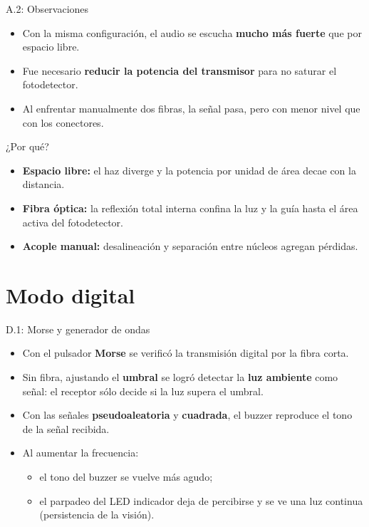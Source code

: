 \documentclass[aspectratio=1610]{beamer}
\begin{document}
\begin{frame}{A.2: Observaciones}
  \begin{itemize}
    \item Con la misma configuración, el audio se escucha \textbf{mucho más fuerte} que por espacio libre.
    \item Fue necesario \textbf{reducir la potencia del transmisor} para no saturar el fotodetector.
    \item Al enfrentar manualmente dos fibras, la señal pasa, pero con menor nivel que con los conectores.
  \end{itemize}

  \vspace{0.3cm}
  \begin{block}{¿Por qué?}
    \begin{itemize}
      \item \textbf{Espacio libre:} el haz diverge y la potencia por unidad de área decae con la distancia.
      \item \textbf{Fibra óptica:} la reflexión total interna confina la luz y la guía hasta el área activa del fotodetector.
      \item \textbf{Acople manual:} desalineación y separación entre núcleos agregan pérdidas.
    \end{itemize}
  \end{block}
\end{frame}

\section[Digital]{Modo digital}
\begin{frame}{D.1: Morse y generador de ondas}
  \begin{itemize}
    \item Con el pulsador \textbf{Morse} se verificó la transmisión digital por la fibra corta.
    \item Sin fibra, ajustando el \textbf{umbral} se logró detectar la \textbf{luz ambiente} como señal: el receptor sólo decide si la luz supera el umbral.
    \item Con las señales \textbf{pseudoaleatoria} y \textbf{cuadrada}, el buzzer reproduce el tono de la señal recibida.
    \item Al aumentar la frecuencia:
    \begin{itemize}
      \item el tono del buzzer se vuelve más agudo;
      \item el parpadeo del LED indicador deja de percibirse y se ve una luz continua (persistencia de la visión).
    \end{itemize}
  \end{itemize}
\end{frame}
\end{document}
